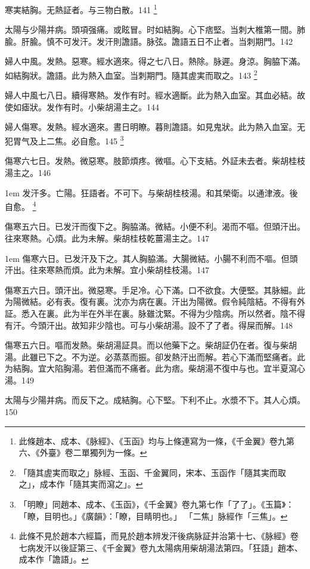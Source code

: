 寒実結胸。无熱証者。与三物白散。141
	\footnote{
		此條趙本、成本、《脉經》、《玉函》均与上條連寫为一條，《千金翼》卷九第六、《外臺》卷二單獨列为一條。
	}

太陽与少陽并病。頭項强痛。或眩冒。时如結胸。心下痞堅。当刺大椎第一間。肺腧。肝腧。慎不可发汗。发汗則譫語。脉弦。譫語五日不止者。当刺期門。142

婦人中風。发熱。惡寒。經水適來。得之七八日。熱除。脉遲。身涼。胸脇下滿。如結胸狀。譫語。此为熱入血室。当刺期門。隨其{\khaaitp 虗}実而取之。143
	\footnote{
		「隨其虗実而取之」脉經、玉函、千金翼同，宋本、玉函作「隨其実而取之」，成本作「隨其実而瀉之」。
	}

婦人中風七八日。續得寒熱。发作有时。經水適斷。此为熱入血室。其血必結。故使如瘧狀。发作有时。小柴胡湯主之。144

婦人傷寒。发熱。經水適來。晝日明瞭。暮則譫語。如見鬼狀。此为熱入血室。无犯胃气及上二焦。必自愈。145
	\footnote{
		「明瞭」同趙本、成本、《玉函》，《千金翼》卷九第七作「了了」。《玉篇》：「瞭，目明也。」《廣韻》：「瞭，目睛明也。」
		「二焦」脉經作「三焦」。
	}

傷寒六七日。发熱。微惡寒。肢節煩疼。微嘔。心下支結。外証未去者。柴胡桂枝湯主之。146

\hangindent 1em
发汗多。亡陽。狂語者。不可下。与柴胡桂枝湯。和其榮衛。以通津液。後自愈。
	\footnote{
		此條不見於趙本六經篇，而見於趙本辨发汗後病脉証并治第十七、《脉經》卷七病发汗以後証第三、《千金翼》卷九太陽病用柴胡湯法第四。「狂語」趙本、成本作「譫語」。
	}

傷寒五六日。已发汗而復下之。胸脇滿。微結。小便不利。渴而不嘔。但頭汗出。往來寒熱。心煩。此为未解。柴胡桂枝乾薑湯主之。147

\hangindent 1em
傷寒六日。已发汗及下之。其人胸脇滿。大腸微結。小腸不利而不嘔。但頭汗出。往來寒熱而煩。此为未解。宜小柴胡桂枝湯。{\gaoben}147

傷寒五六日。頭汗出。微惡寒。手足冷。心下滿。口不欲食。大便堅。其脉細。此为陽微結。必有表。復有裏。沈亦为病在裏。汗出为陽微。假令純陰結。不得有外証。悉入在裏。此为半在外半在裏。脉雖沈緊。不得为少陰病。所以然者。陰不得有汗。今頭汗出。故知非少陰也。可与{\khaaitp 小}柴胡湯。設不了了者。得屎而解。148

傷寒五六日。嘔而发熱。柴胡湯証具。而以他藥下之。柴胡証仍在者。復与柴胡湯。此雖已下之。不为逆。必蒸蒸而振。卻发熱汗出而解。若心下滿而堅痛者。此为結胸。宜大陷胸湯。若但滿而不痛者。此为痞。柴胡{\khaaitp 湯}不復中与也。宜半夏瀉心湯。149

太陽与少陽并病。而反下之。{\khaaitp 成}結胸。心下堅。下利不止。水漿不下。其人心煩。150

